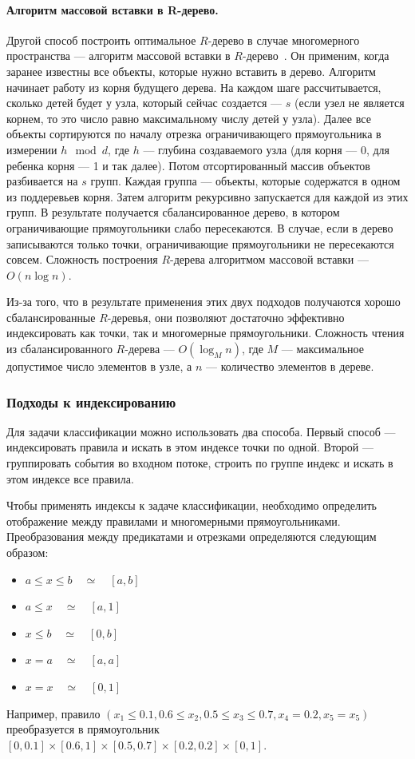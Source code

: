 \documentclass[14pt]{article}
\begin{document}
\paragraph{Алгоритм массовой вставки в R-дерево.} Другой способ построить оптимальное $R$-дерево в случае многомерного пространства --- алгоритм массовой вставки в $R$-дерево~\cite{str, omt}. Он применим, когда заранее известны все объекты, которые нужно вставить в дерево. Алгоритм начинает работу из корня будущего дерева. На каждом шаге рассчитывается, сколько детей будет у узла, который сейчас создается --- $s$ (если узел не является корнем, то это число равно максимальному числу детей у узла). Далее все объекты сортируются по началу отрезка ограничивающего прямоугольника в измерении $h\mod d$, где $h$ --- глубина создаваемого узла (для корня --- 0, для ребенка корня --- 1 и так далее). Потом отсортированный массив объектов разбивается на $s$ групп. Каждая группа --- объекты, которые содержатся в одном из поддеревьев корня. Затем алгоритм рекурсивно запускается для каждой из этих групп. В результате получается сбалансированное дерево, в котором ограничивающие прямоугольники слабо пересекаются. В случае, если в дерево записываются только точки, ограничивающие прямоугольники не пересекаются совсем. Сложность построения $R$-дерева алгоритмом массовой вставки --- $O(n\log n)$.

Из-за того, что в результате применения этих двух подходов получаются хорошо сбалансированные $R$-деревья, они позволяют достаточно эффективно индексировать как точки, так и многомерные прямоугольники. Сложность чтения из сбалансированного $R$-дерева --- $O(\log_M n)$, где $M$ --- максимальное допустимое число элементов в узле, а $n$ --- количество элементов в дереве.

\subsubsection{Подходы к индексированию}
\label{section:indexingApproaches}
Для задачи классификации можно использовать два способа. Первый способ --- индексировать правила и искать в этом индексе точки по одной. Второй --- группировать события во входном потоке, строить по группе индекс и искать в этом индексе все правила.

Чтобы применять индексы к задаче классификации, необходимо определить отображение между правилами и многомерными прямоугольниками. Преобразования между предикатами и отрезками определяются следующим образом:
\begin{itemize}
    \item $a \leq x \leq b \quad \simeq \quad [a ,b]$
    \item $a \leq x \quad \simeq \quad [a, 1]$
    \item $x \leq b \quad \simeq \quad [0, b]$
    \item $ x = a \quad \simeq \quad [a, a]$
    \item $ x = x \quad \simeq \quad [0, 1]$
\end{itemize}
Например, правило $(x_1 \leq 0.1, 0.6 \leq x_2, 0.5 \leq x_3 \leq 0.7, x_4 = 0.2, x_5 = x_5)$ преобразуется в прямоугольник $[0, 0.1]\times[0.6, 1]\times[0.5, 0.7]\times[0.2, 0.2]\times[0, 1]$.
\end{document}
